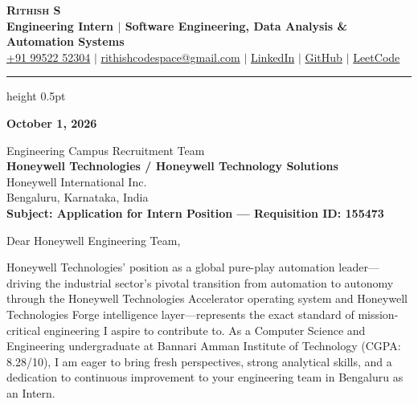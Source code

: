 \documentclass[letterpaper,11pt]{article}
\begin{document}
\begin{center}
    {\textbf{\Huge \scshape Rithish S}} \\ \vspace{3pt}
    {\small \textbf{\color{headingcolor}Engineering Intern $|$ Software Engineering, Data Analysis \& Automation Systems}} \\ \vspace{3pt}
    \small
    \href{tel:+919952252304}{+91 99522 52304} $|$
    \href{mailto:rithishcodespace@gmail.com}{rithishcodespace@gmail.com} $|$
    \href{https://www.linkedin.com/in/rithish-saravanan-32a39431a/}{LinkedIn} $|$
    \href{https://github.com/rithishcodespace}{GitHub} $|$
    \href{https://leetcode.com/rithishcodespace}{LeetCode}
\end{center}

\vspace{-4pt}
\hrule height 0.5pt \relax
\vspace{10pt}

\textbf{October 1, 2026}

\vspace{2pt}
Engineering Campus Recruitment Team \\
\textbf{Honeywell Technologies / Honeywell Technology Solutions} \\
Honeywell International Inc. \\
Bengaluru, Karnataka, India \\

\vspace{4pt}
\textbf{Subject: Application for Intern Position — Requisition ID: 155473}

\vspace{4pt}
Dear Honeywell Engineering Team,

Honeywell Technologies' position as a global pure-play automation leader—driving the industrial sector's pivotal transition from automation to autonomy through the Honeywell Technologies Accelerator operating system and Honeywell Technologies Forge intelligence layer—represents the exact standard of mission-critical engineering I aspire to contribute to. As a Computer Science and Engineering undergraduate at Bannari Amman Institute of Technology (CGPA: 8.28/10), I am eager to bring fresh perspectives, strong analytical skills, and a dedication to continuous improvement to your engineering team in Bengaluru as an Intern.
\end{document}
